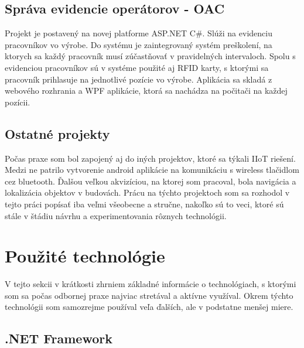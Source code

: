 \documentclass[11pt, oneside]{report}
\begin{document}
\section{Správa evidencie operátorov - OAC}
Projekt je postavený na novej platforme ASP.NET C\#. Slúži na evidenciu  pracovníkov vo výrobe. Do systému je zaintegrovaný systém preškolení, na ktorych sa každý pracovník musí zúčastňovať v pravidelných intervaloch. Spolu s evidenciou pracovníkov sú v systéme použité aj RFID karty, s ktorými sa pracovník prihlasuje na jednotlivé pozície vo výrobe. Aplikácia sa skladá z webového rozhrania a  WPF aplikácie, ktorá sa nachádza na počitači na každej pozícii.

\section{Ostatné projekty}
Počas praxe som bol zapojený aj do iných projektov, ktoré sa týkali IIoT riešení. Medzi ne patrilo vytvorenie android aplikácie na komunikáciu s wireless tlačidlom cez bluetooth. Ďalšou veľkou akvizíciou, na ktorej som pracoval, bola navigácia a lokalizácia objektov v budovách. Prácu na týchto projektoch som sa rozhodol v tejto práci popísať iba veľmi všeobecne a stručne, nakoľko sú to veci, ktoré sú stále v štádiu návrhu a experimentovania rôznych technológii.

\chapter{Použité technológie}
V tejto sekcii v krátkosti zhrniem základné informácie o technológiach, s ktorými som sa počas odbornej praxe najviac stretával a aktívne využíval. Okrem týchto  technológii som samozrejme používal veľa ďalších, ale v podstatne menšej miere.

\section{.NET Framework}
\end{document}

